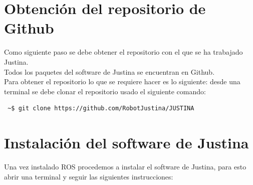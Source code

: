 \documentclass[user_manual.tex]{subfiles}
\begin{document}
 \section{Obtención del repositorio de Github}
 Como siguiente paso se debe obtener el repositorio con el que se ha trabajado Justina.\\
 
 Todos los paquetes del software de Justina se encuentran en Github.\\
Para obtener el repositorio lo que se requiere hacer es lo siguiente: desde una terminal se debe clonar el repositorio  usado el siguiente comando:\\

\begin{verbatim}
 ~$ git clone https://github.com/RobotJustina/JUSTINA
\end{verbatim}
 
\section{Instalación del software de Justina}
Una vez instalado ROS procedemos a instalar el software de Justina, para esto abrir una terminal y seguir las siguientes instrucciones:
\end{document}
